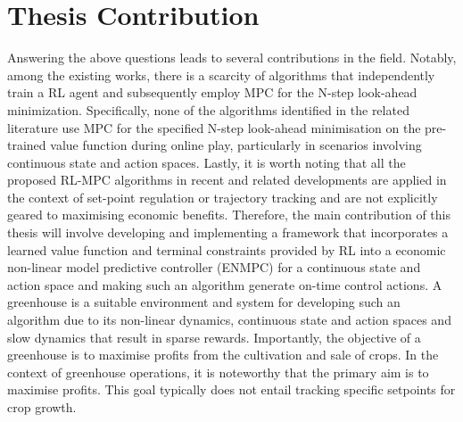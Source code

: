 \section{Thesis Contribution}

Answering the above questions leads to several contributions in the field. Notably, among the existing works, there is a scarcity of algorithms that independently train a RL agent and subsequently employ MPC for the N-step look-ahead minimization. Specifically, none of the algorithms identified in the related literature use MPC for the specified N-step look-ahead minimisation on the pre-trained value function during online play, particularly in scenarios involving continuous state and action spaces. Lastly, it is worth noting that all the proposed RL-MPC algorithms in recent and related developments are applied in the context of set-point regulation or trajectory tracking and are not explicitly geared to maximising economic benefits.
Therefore, the main contribution of this thesis will involve developing and implementing a framework that incorporates a learned value function and terminal constraints provided by RL into a economic non-linear model predictive controller (ENMPC) for a continuous state and action space and making such an algorithm generate on-time control actions. A greenhouse is a suitable environment and system for developing such an algorithm due to its non-linear dynamics, continuous state and action spaces and slow dynamics that result in sparse rewards. Importantly, the objective of a greenhouse is to maximise profits from the cultivation and sale of crops. In the context of greenhouse operations, it is noteworthy that the primary aim is to maximise profits. This goal typically does not entail tracking specific setpoints for crop growth.


